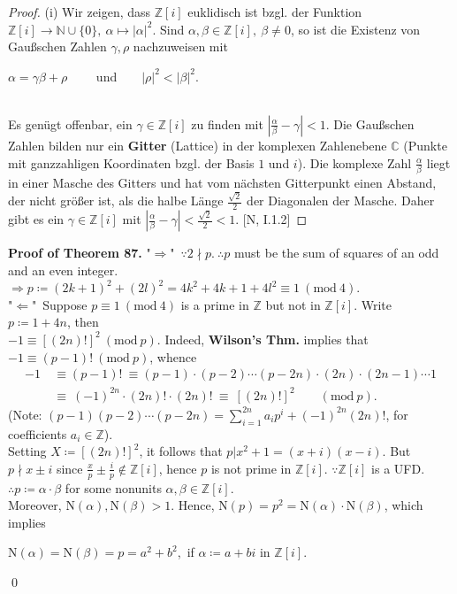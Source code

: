 \documentclass[12pt,a4paper,footinclude=true,headinclude=true]{scrbook} %
\newenvironment{proofthm}[2][Proof of Theorem]
    { \begin{mdframed}[backgroundcolor=gray!20] \textbf{#1 #2.} }
    {  \end{mdframed}}
\begin{document}
\begin{proof}
    (i) Wir zeigen, dass $\mathbb{Z}[i]$ euklidisch ist bzgl. der Funktion $\mathbb{Z}[i]\to\mathbb{N}\cup\{0\},\ \alpha\mapsto|\alpha|^2$. Sind $\alpha,\beta\in\mathbb{Z}[i],\ \beta\neq0$, so ist die Existenz von Gau\ss schen Zahlen $\gamma,\rho$ nachzuweisen mit\\ \centerline{$\alpha=\gamma\beta+\rho\qquad$ und$\qquad |\rho|^2<|\beta|^2$.}\\
    Es gen\"{u}gt offenbar, ein $\gamma\in\mathbb{Z}[i]$ zu finden mit $|\frac{\alpha}{\beta}-\gamma|<1$. Die Gau\ss schen Zahlen bilden nur ein \textbf{Gitter} (Lattice) in der komplexen Zahlenebene $\mathbb{C}$ (Punkte mit ganzzahligen Koordinaten bzgl. der Basis $1$ und $i$). Die komplexe Zahl $\frac{\alpha}{\beta}$ liegt in einer Masche des Gitters und hat vom n\"{a}chsten Gitterpunkt einen Abstand, der nicht gr\"{o}\ss er ist, als die halbe L\"{a}nge $\frac{\sqrt{2}}{2}$ der Diagonalen der Masche. Daher gibt es ein $\gamma\in\mathbb{Z}[i]$ mit $|\frac{\alpha}{\beta}-\gamma|<\frac{\sqrt{2}}{2}<1$. [N, I.1.2]
\end{proof}

\begin{proofthm}{87} 
    "$\Rightarrow$"\ $\because 2\nmid p.\ \therefore p$ must be the sum of squares of an odd and an even integer. $\Rightarrow p\coloneqq(2k+1)^2+(2l)^2=4k^2+4k+1+4l^2 \equiv1\ (\mathrm{mod}\ 4)$.\\
    "$\Leftarrow$"\ Suppose $p\equiv1\ (\mathrm{mod}\ 4)$ is a prime in $\mathbb{Z}$ but not in $\mathbb{Z}[i]$. Write $p\coloneqq1+4n$, then\\ $-1\equiv [(2n)!]^2\ (\mathrm{mod}\ p)$. Indeed, \textbf{Wilson's Thm.} implies that $-1\equiv(p-1)!\ (\mathrm{mod}\ p)$, whence 
    \begin{align*}
        -1 &\ \equiv (p-1)!\ \equiv (p-1)\cdot(p-2)\cdots (p-2n)\cdot(2n)\cdot(2n-1)\cdots1 \\ &\ \equiv\  (-1)^{2n}\cdot(2n)!\cdot(2n)!\ 
        \equiv\ [(2n)!]^2\qquad (\mathrm{mod}\ p).
    \end{align*}
    (Note: $(p-1)(p-2)\cdots(p-2n)=\sum_{i=1}^{2n}a_ip^i+(-1)^{2n}(2n)!$, for coefficients $a_i\in\mathbb{Z}$). \\ Setting $X\coloneqq [(2n)!]^2$, it follows that $p|x^2+1=(x+i)(x-i)$. But $p\nmid x\pm i$ since $\frac{x}{p}\pm\frac{i}{p}\notin\mathbb{Z}[i]$, hence $p$ is not prime in $\mathbb{Z}[i]$. 
    $\because\mathbb{Z}[i]$ is a UFD. $\therefore p\coloneqq\alpha\cdot \beta$ for some nonunits $\alpha,\beta\in\mathbb{Z}[i]$.\\ Moreover, $\mathrm{N}(\alpha),\mathrm{N}(\beta)>1$. Hence, $\mathrm{N}(p)= p^2=\mathrm{N}(\alpha)\cdot\mathrm{N}(\beta)$, which implies\\
    \centerline{$\mathrm{N}(\alpha)=\mathrm{N}(\beta)=p=a^2+b^2$,\ if $\alpha\coloneqq a+bi$ in $\mathbb{Z}[i]$.} \qed
\end{proofthm}
\end{document}
